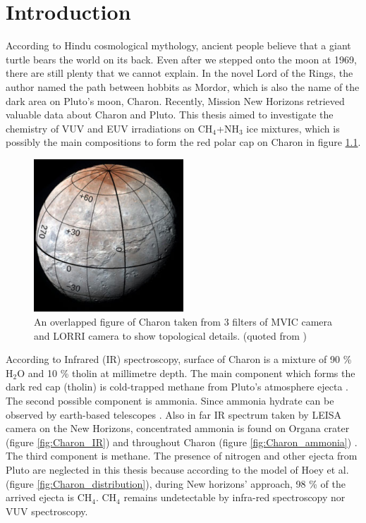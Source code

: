 \chapter{\protect Introduction}
\label{introduction}

According to Hindu cosmological mythology, ancient people believe that a giant turtle bears the world on its back. Even after we stepped onto the moon at 1969, there are still plenty that we cannot explain. In the novel Lord of the Rings, the author named the path between hobbits as Mordor, which is also the name of the dark area on Pluto's moon, Charon. Recently, Mission New Horizons retrieved valuable data about Charon and Pluto. This thesis aimed to investigate the chemistry of VUV and EUV irradiations on CH$_4$+NH$_3$ ice mixtures, which is possibly the main compositions to form the red polar cap on Charon in figure \ref{fig:charon}.

\begin{figure}
\centering
\includegraphics[width=0.5\textwidth]{figures/chapter1/charon.png}
\caption{An overlapped figure of Charon taken from 3 filters of MVIC camera and LORRI camera to show topological details. (quoted from \cite{grundy2016formation})}
\label{fig:charon}
\end{figure}

According to Infrared (IR) spectroscopy, surface of Charon is a mixture of 90 \% H$_2$O and 10 \% tholin at millimetre depth. The main component which forms the dark red cap (tholin) is cold-trapped methane from Pluto's atmosphere ejecta \cite{hoey2017rarefied}. The second possible component is ammonia. Since ammonia hydrate can be observed by earth-based telescopes \cite{cook2007near}. Also in far IR spectrum taken by LEISA camera on the New Horizons, concentrated ammonia is found on Organa crater (figure \ref{fig:Charon_IR}) and throughout Charon (figure \ref{fig:Charon_ammonia}) \cite{grundy2016surface}. The third component is methane. The presence of nitrogen and other ejecta from Pluto are neglected in this thesis because according to the model of Hoey et al.\cite{hoey2017rarefied} (figure \ref{fig:Charon_distribution}), during New horizons' approach, 98 \% of the arrived ejecta is CH$_4$. CH$_4$ remains undetectable by infra-red spectroscopy nor VUV spectroscopy.

